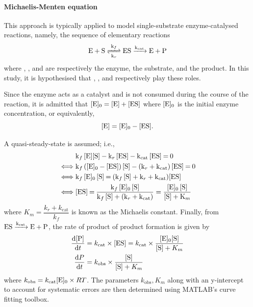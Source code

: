 \documentclass[a4paper, 12pt]{article}
\begin{document}
\paragraph{Michaelis-Menten equation}
This approach is typically applied to model single-substrate enzyme-catalysed reactions, namely, the sequence of elementary reactions
\[
\ce{E + S <=>[ k_f ][ k_r ] ES ->[ k_{\text{cat}} ] E + P}
\]
where , , and  are respectively the enzyme, the substrate, and the product. In this study, it is hypothesised that , , and  respectively play these roles.

Since the enzyme acts as a catalyst and is not consumed during the course of the reaction, it is admitted that $\ce{[E]_0} = \ce{[E] + [ES]}$ where $\ce{[E]_0}$ is the initial enzyme concentration, or equivalently, 
\[
\ce{[E]} = \ce{[E]_0 - [ES]}.
\]

A quasi-steady-state is assumed; i.e., 
\begin{align*}
    &\ce{k_f [E][S] - k_r [ES] - k_{\text{cat}} [ES] = 0}\\
    \iff &\ce{k_f ([E]_0 - [ES]) [S] - (k_r + k_{\text{cat}}) [ES] = 0}\\
    \iff &\ce{k_f [E]_0 [S] = (k_f [S] + k_r + k_{\text{cat}})[ES]}\\
    \iff &\ce{[ES] = \frac{k_f [E]_0 [S]}{k_f [S] + (k_r + k_{\text{cat}})}}
    = \ce{\frac{[E]_0 [S]}{[S] + K_m}}
\end{align*}
where $K_m = \dfrac{k_r + k_\text{cat}}{k_f}$ is known as the Michaelis constant. Finally, from $\ce{ES ->[k_{\text{cat}}] E + P}$, the rate of product of product formation is given by
\begin{align}
    \dv{\ce{[P]}}{t} &= k_{\text{cat}} \times \ce{[ES]} = k_{\text{cat}} \times \frac{\ce{[E]_0[S]}}{\ce{[S]} + K_m}
\nonumber\\
    \dv{P}{t} &= k_{\text{obs}} \times \frac{\ce{[S]}}{\ce{[S]} + K_m}\label{eq:mm}
\end{align}
where $k_{\text{obs}} = k_\text{cat} \ce{[E]_0} \times R T$. The parameters $k_{\text{obs}}, K_m$ along with an y-intercept to account for systematic errors are then determined using MATLAB's curve fitting toolbox.
\end{document}
